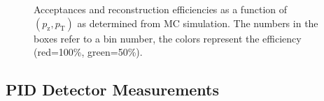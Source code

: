 \documentclass[%
aps, prd, reprint, show pacs, preprint numbers, ams math, amssymb, superscriptaddress, linenumbers]{revtex4-1}
\def\pzpt{$(p_\mathrm{z},p_\mathrm{T})$\xspace}
\begin{document}
\begin{figure}[t]
  \centering
  \caption{Acceptances and reconstruction efficiencies as a function of \pzpt as determined from MC simulation.  The numbers in the boxes refer to a bin number, the colors represent the efficiency (red=100\%, green=50\%).}
  \label{Fig:AcceptPlots}
\end{figure}

\subsection{PID Detector Measurements}
\end{document}
